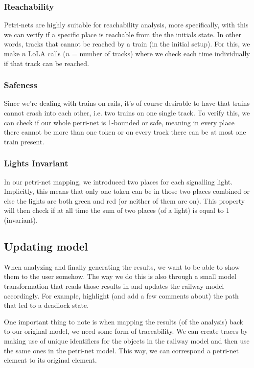\documentclass{article}
\begin{document}
\subsubsection{Reachability}

Petri-nets are highly suitable for reachability analysis, more specifically, with this we can verify if a specific place is reachable from the the initials state. In other words, tracks that cannot be reached by a train (in the initial setup). For this, we make $n$ LoLA calls ($n$ = number of tracks) where we check each time individually if that track can be reached.

\subsubsection{Safeness}

Since we're dealing with trains on rails, it's of course desirable to have that trains cannot crash into each other, i.e. two trains on one single track. To verify this, we can check if our whole petri-net is 1-bounded or safe, meaning in every place there cannot be more than one token or on every track there can be at most one train present.

\subsubsection{Lights Invariant}

In our petri-net mapping, we introduced two places for each signalling light. Implicitly, this means that only one token can be in those two places combined or else the lights are both green and red (or neither of them are on). This property will then check if at all time the sum of two places (of a light) is equal to $1$ (invariant).

\subsection{Updating model}
\label{safety_updating}

When analyzing and finally generating the results, we want to be able to show them to the user somehow. The way we do this is also through a small model transformation that reads those results in and updates the railway model accordingly. For example, highlight (and add a few comments about) the path that led to a deadlock state.

One important thing to note is when mapping the results (of the analysis) back to our original model, we need some form of traceability. We can create traces by making use of unique identifiers for the objects in the railway model and then use the same ones in the petri-net model. This way, we can correspond a petri-net element to its original element.
\end{document}
